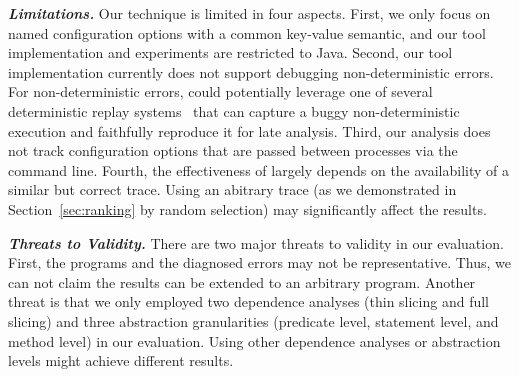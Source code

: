 \noindent \textbf{\textit{Limitations.}} 
Our technique is limited in four aspects.
First, we only focus on named configuration options
with a common key-value semantic, and our tool implementation
and experiments are
restricted to Java. 
Second,  our tool implementation currently does not
support debugging non-deterministic errors. 
For non-deterministic errors, \ourtool could potentially leverage one of
several deterministic replay systems~\cite{Huang:2010:LLD}
that can capture a buggy non-deterministic
execution and faithfully reproduce it for late analysis.
Third, our analysis does not track configuration
options that are passed between processes via the command line.
Fourth, the effectiveness of \ourtool largely
depends on the availability of a similar but correct trace.
Using an abitrary trace (as we demonstrated in Section~\ref{sec:ranking}
by random selection) may significantly affect the results.







\vspace{1mm}

\noindent \textbf{\textit{Threats to Validity.}} 
There are two major threats to validity in our evaluation. 
First, the \subjectnum programs and the diagnosed errors may not be
representative. Thus, we can not claim the results can be
extended to an arbitrary program.
Another threat is that we only employed two dependence
analyses (thin slicing and full slicing) and three
abstraction granularities (predicate level,
statement level, and method level) in our evaluation.
 Using other dependence analyses or abstraction levels
might achieve different results.




